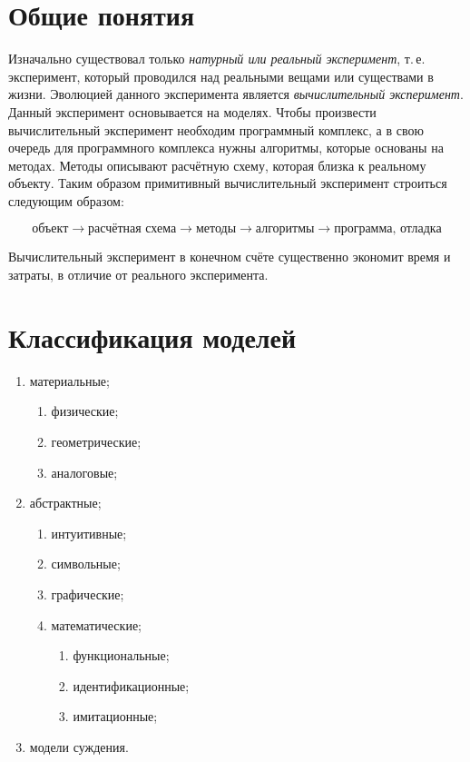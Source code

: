 
\section{Общие понятия}

Изначально существовал только \textit{натурный или реальный эксперимент}, т.\,е. эксперимент, который проводился над реальными вещами или существами в жизни. Эволюцией данного эксперимента является \textit{вычислительный эксперимент}. Данный эксперимент основывается на моделях. Чтобы произвести вычислительный эксперимент необходим программный комплекс, а в свою очередь для программного комплекса нужны алгоритмы, которые основаны на методах. Методы описывают расчётную схему, которая близка к реальному объекту. Таким образом примитивный вычислительный эксперимент строиться следующим образом:

\[
	\text{объект} \to \text{расчётная схема} \to \text{методы} \to \text{алгоритмы} \to \text{программа, отладка}
\]

Вычислительный эксперимент в конечном счёте существенно экономит время и затраты, в отличие от реального эксперимента.

\section{Классификация моделей}

\begin{enumerate}
	\item материальные;
	\begin{enumerate}
		\item физические;
		\item геометрические;
		\item аналоговые;
	\end{enumerate}
	\item абстрактные;
	\begin{enumerate}
		\item интуитивные;
		\item символьные;
		\item графические;
		\item математические;
		\begin{enumerate}
			\item функциональные;
			\item идентификационные;
			\item имитационные;
		\end{enumerate}
	\end{enumerate}
	\item модели суждения.
\end{enumerate}